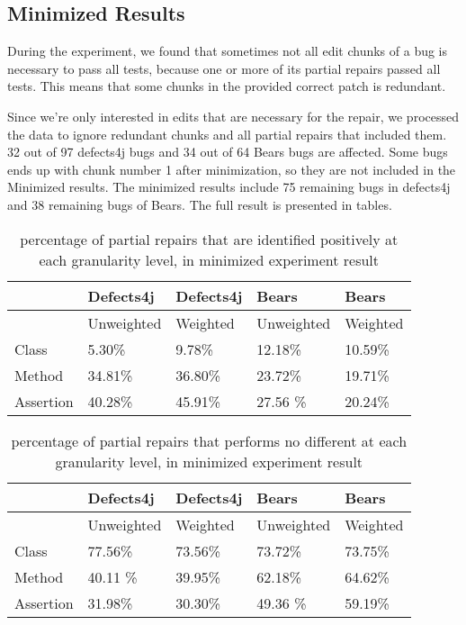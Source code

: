 \documentclass[sigconf, timestamp-false, anonymous=true]{acmart}
\begin{document}
    

\subsection{Minimized Results}

During the experiment, we found that sometimes not all edit 
chunks of a bug is necessary to pass all tests, 
because one or more of its partial repairs passed all tests. This means that 
some chunks in the provided correct patch is redundant. 

Since we're only interested in edits that are necessary for the repair, 
we processed the data to ignore redundant chunks and all partial repairs 
that included them. 32 out of 97 defects4j bugs and 34 out of 64 Bears 
bugs are affected. Some bugs ends up with chunk number 1 after minimization, 
so they are not included in the Minimized results. The minimized results 
include 75 remaining bugs in defects4j and 38 remaining bugs of Bears. 
The full result is presented in tables.

    
\begin{table}
{\begin{center}
    \begin{tabular}{| l | l | l | l | l |} \hline
     & Defects4j & Defects4j & Bears & Bears  \\ \hline
     & Unweighted & Weighted & Unweighted & Weighted \\ \hline
    Class & 5.30\% & 9.78\% & 12.18\% & 10.59\%\\
    Method & 34.81\% & 36.80\% & 23.72\% & 19.71\% \\
    Assertion & 40.28\% & 45.91\% & 27.56 \% & 20.24\% \\
    \hline
    
    \end{tabular}
\end{center}}
\caption{percentage of partial repairs that are identified positively at each granularity level, in minimized experiment result}
\end{table}
    
\begin{table}
{\begin{center}
    \begin{tabular}{| l | l | l | l | l |} \hline
     & Defects4j & Defects4j & Bears & Bears  \\ \hline
     & Unweighted & Weighted & Unweighted & Weighted \\ \hline
    Class & 77.56\% & 73.56\% & 73.72\% & 73.75\%\\
    Method & 40.11 \% & 39.95\% & 62.18\% & 64.62\% \\
    Assertion & 31.98\% & 30.30\% & 49.36 \% & 59.19\% \\
    \hline
    
    \end{tabular}
    
\end{center}}
\caption{percentage of partial repairs that performs no different at each granularity level, in minimized experiment result}
\end{table}
\end{document}
